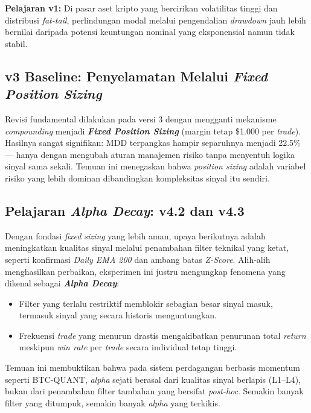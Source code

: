 \textbf{Pelajaran v1:} Di pasar aset kripto yang bercirikan volatilitas tinggi dan distribusi \textit{fat-tail}, perlindungan modal melalui pengendalian \textit{drawdown} jauh lebih bernilai daripada potensi keuntungan nominal yang eksponensial namun tidak stabil.

\subsection{v3 Baseline: Penyelamatan Melalui \textit{Fixed Position Sizing}}

Revisi fundamental dilakukan pada versi 3 dengan mengganti mekanisme \textit{compounding} menjadi \textbf{\textit{Fixed Position Sizing}} (margin tetap \$1.000 per \textit{trade}). Hasilnya sangat signifikan: MDD terpangkas hampir separuhnya menjadi 22.5\% --- hanya dengan mengubah aturan manajemen risiko tanpa menyentuh logika sinyal sama sekali. Temuan ini menegaskan bahwa \textit{position sizing} adalah variabel risiko yang lebih dominan dibandingkan kompleksitas sinyal itu sendiri.

\subsection{Pelajaran \textit{Alpha Decay}: v4.2 dan v4.3}

Dengan fondasi \textit{fixed sizing} yang lebih aman, upaya berikutnya adalah meningkatkan kualitas sinyal melalui penambahan filter teknikal yang ketat, seperti konfirmasi \textit{Daily EMA 200} dan ambang batas \textit{Z-Score}. Alih-alih menghasilkan perbaikan, eksperimen ini justru mengungkap fenomena yang dikenal sebagai \textbf{\textit{Alpha Decay}}:
\begin{itemize}
    \item Filter yang terlalu restriktif memblokir sebagian besar sinyal masuk, termasuk sinyal yang secara historis menguntungkan.
    \item Frekuensi \textit{trade} yang menurun drastis mengakibatkan penurunan total \textit{return} meskipun \textit{win rate} per \textit{trade} secara individual tetap tinggi.
\end{itemize}

Temuan ini membuktikan bahwa pada sistem perdagangan berbasis momentum seperti BTC-QUANT, \textit{alpha} sejati berasal dari kualitas sinyal berlapis (L1--L4), bukan dari penambahan filter tambahan yang bersifat \textit{post-hoc}. Semakin banyak filter yang ditumpuk, semakin banyak \textit{alpha} yang terkikis.

